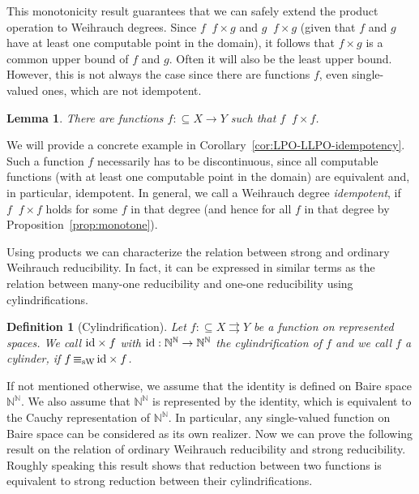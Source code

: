 \documentclass[jsl,10pt]{noasl}
\def\IN{{\mathbb{N}}}
\def\In{\subseteq}
\def\mto{\rightrightarrows}
\def\id{{\rm id}}
\def\leqW{\mathop{\leq_{\mathrm{W}}}}
\def\equivW{\mathop{\equiv_{\mathrm{W}}}}
\def\nequivW{\mathop{\not\equiv_{\mathrm{W}}}}
\def\equivSW{\mathop{\equiv_{\mathrm{sW}}}}
\newtheorem{lemma}[proposition]{Lemma}
\newtheorem{definition}[proposition]{Definition}
\begin{document}
This monotonicity result guarantees that we can safely extend the product
operation to Weihrauch degrees.
Since $f\leqW f\times g$ and $g\leqW f\times g$ (given that $f$ and $g$ have at least one computable
point in the domain), it follows that $f\times g$ is a common upper bound of $f$ and $g$.
Often it will also be the least upper bound. However, this is not always the case
since there are functions $f$, even single-valued ones, which are not idempotent.

\begin{lemma}
There are functions $f:\In X\to Y$ such that $f\nequivW f\times f$. 
\end{lemma}

We will provide a concrete example in Corollary~\ref{cor:LPO-LLPO-idempotency}.
Such a function $f$ necessarily has to be discontinuous, since all
computable functions (with at least one computable point in the domain)
are equivalent and, in particular, idempotent. In general, we call
a Weihrauch degree {\em idempotent}, if $f\equivW f\times f$ holds
for some $f$ in that degree (and hence for all $f$ in that degree by Proposition~\ref{prop:monotone}).

Using products we can characterize the relation between strong
and ordinary Weihrauch reducibility. In fact, it can be expressed
in similar terms as the relation between many-one reducibility and one-one
reducibility using cylindrifications.

\begin{definition}[Cylindrification]\rm
Let $f:\In X\mto Y$ be a function on represented spaces.
We call $\id\times f$ with $\id:\IN^\IN\to\IN^\IN$ the
{\em cylindrification} of $f$ and we call $f$ a {\em cylinder},
if $f\equivSW\id\times f$.
\end{definition}

If not mentioned otherwise, we assume that the identity is defined
on Baire space $\IN^\IN$. We also assume that $\IN^\IN$ is represented
by the identity,
which is equivalent to the Cauchy representation of $\IN^\IN$. In particular, any single-valued function
on Baire space can be considered as its own realizer.
Now we can prove the following result on the relation of ordinary
Weihrauch reducibility and strong reducibility. Roughly speaking this result shows
that reduction between two functions is equivalent to strong reduction between their
cylindrifications.
\end{document}
